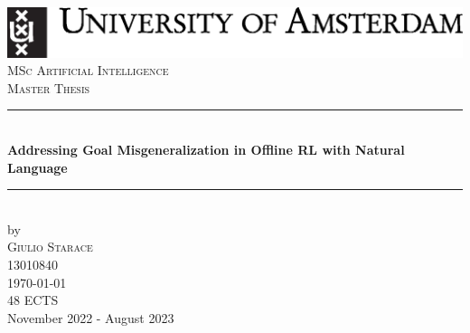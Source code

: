\documentclass[../main.tex]{subfiles}
\begin{document}
\begin{titlepage}
    \newcommand{\HRule}{\rule{\linewidth}{0.5mm}} %
    \center %


    \includegraphics[width=\textwidth]{logos/uvalogo_regular_p_en.eps}\\
    \vfill
    \textsc{\Large MSc Artificial Intelligence}\\[0.2cm]
    \textsc{\Large Master Thesis}\\[0.5cm]


    \HRule \\[0.4cm]
    { \huge \bfseries Addressing Goal Misgeneralization in Offline RL with Natural Language} %
    \HRule \\[0.5cm]


    by\\[0.2cm]
    \textsc{\Large Giulio Starace}\\[0.2cm] %
    13010840\\[1cm]


    {\Large \today}\\[1cm] %

    48 ECTS\\ %
    November 2022 - August 2023\\[1cm]%


\end{titlepage}
\end{document}
